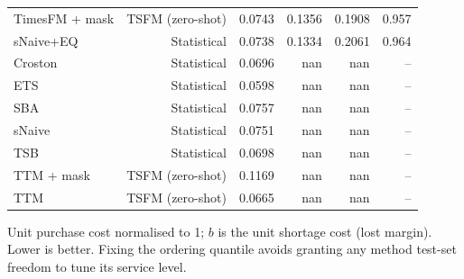\begin{table}[t]
\begin{tabular}{lrrrrr}
TimesFM + mask & TSFM (zero-shot) & 0.0743 & 0.1356 & 0.1908 & 0.957 \\
sNaive+EQ & Statistical & 0.0738 & 0.1334 & 0.2061 & 0.964 \\
Croston & Statistical & 0.0696 & nan & nan & -- \\
ETS & Statistical & 0.0598 & nan & nan & -- \\
SBA & Statistical & 0.0757 & nan & nan & -- \\
sNaive & Statistical & 0.0751 & nan & nan & -- \\
TSB & Statistical & 0.0698 & nan & nan & -- \\
TTM + mask & TSFM (zero-shot) & 0.1169 & nan & nan & -- \\
TTM & TSFM (zero-shot) & 0.0665 & nan & nan & -- \\
\bottomrule
\end{tabular}
\begin{tablenotes}\footnotesize
\item Unit purchase cost normalised to 1; $b$ is the unit shortage cost (lost margin). Lower is better. Fixing the ordering quantile avoids granting any method test-set freedom to tune its service level.
\end{tablenotes}
\end{table}
